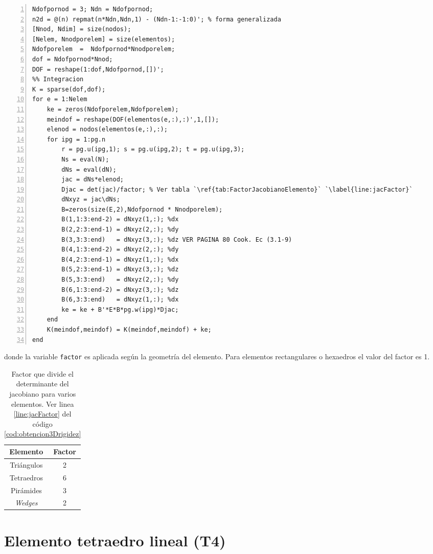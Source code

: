 \begin{lstlisting}[caption={Programa generalizado para obtener \( \MK \) para elementos 3D.},numbers=left,label={cod:obtencion3Drigidez}]
%% Dofinitions
Ndofpornod = 3; Ndn = Ndofpornod;
n2d = @(n) repmat(n*Ndn,Ndn,1) - (Ndn-1:-1:0)'; % forma generalizada
[Nnod, Ndim] = size(nodos);
[Nelem, Nnodporelem] = size(elementos);
Ndofporelem  =  Ndofpornod*Nnodporelem;
dof = Ndofpornod*Nnod;
DOF = reshape(1:dof,Ndofpornod,[])';
%% Integracion
K = sparse(dof,dof);
for e = 1:Nelem
    ke = zeros(Ndofporelem,Ndofporelem);
    meindof = reshape(DOF(elementos(e,:),:)',1,[]);
    elenod = nodos(elementos(e,:),:);
    for ipg = 1:pg.n
        r = pg.u(ipg,1); s = pg.u(ipg,2); t = pg.u(ipg,3);
        Ns = eval(N);
        dNs = eval(dN); 
        jac = dNs*elenod;
        Djac = det(jac)/factor; % Ver tabla `\ref{tab:FactorJacobianoElemento}` `\label{line:jacFactor}`
        dNxyz = jac\dNs;
        B=zeros(size(E,2),Ndofpornod * Nnodporelem);
        B(1,1:3:end-2) = dNxyz(1,:); %dx
        B(2,2:3:end-1) = dNxyz(2,:); %dy  
        B(3,3:3:end)   = dNxyz(3,:); %dz VER PAGINA 80 Cook. Ec (3.1-9)
        B(4,1:3:end-2) = dNxyz(2,:); %dy
        B(4,2:3:end-1) = dNxyz(1,:); %dx
        B(5,2:3:end-1) = dNxyz(3,:); %dz
        B(5,3:3:end)   = dNxyz(2,:); %dy
        B(6,1:3:end-2) = dNxyz(3,:); %dz
        B(6,3:3:end)   = dNxyz(1,:); %dx
        ke = ke + B'*E*B*pg.w(ipg)*Djac;
    end
    K(meindof,meindof) = K(meindof,meindof) + ke;
end
\end{lstlisting}
donde la variable \texttt{factor} es aplicada según la geometría del elemento. Para elementos rectangulares o hexaedros el valor del factor es 1. 

\begin{table}[htb!]
    \centering
    \begin{tabular}{c|c}
        Elemento & Factor \\ \hline
        Triángulos & 2 \\
        Tetraedros & 6 \\
        Pirámides  &  3 \\
        \emph{Wedges}& 2  \\
    \end{tabular}
\caption{Factor que divide el determinante del jacobiano para varios elementos. Ver linea \ref{line:jacFactor} del código \ref{cod:obtencion3Drigidez}}
\label{tab:FactorJacobianoElemento}
\end{table}

\section{Elemento tetraedro lineal (T4)}

